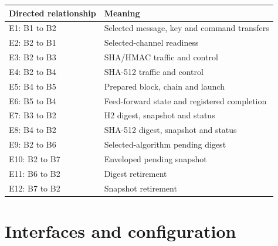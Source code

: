 \documentclass[11pt,a4paper]{article}
\begin{document}
{\small\renewcommand{\arraystretch}{1.18}\begin{longtable}{@{}L{0.24\textwidth}|L{0.7\textwidth}@{}}\toprule

\textbf{Directed relationship} & \textbf{Meaning}\\\midrule\endhead

E1: B1 to B2 & Selected message,\allowbreak{} key and command transfers\\[2pt]\hline

E2: B2 to B1 & Selected-channel readiness\\[2pt]\hline

E3: B2 to B3 & SHA/\allowbreak{}HMAC traffic and control\\[2pt]\hline

E4: B2 to B4 & SHA-512 traffic and control\\[2pt]\hline

E5: B4 to B5 & Prepared block,\allowbreak{} chain and launch\\[2pt]\hline

E6: B5 to B4 & Feed-forward state and registered completion\\[2pt]\hline

E7: B3 to B2 & H2 digest,\allowbreak{} snapshot and status\\[2pt]\hline

E8: B4 to B2 & SHA-512 digest,\allowbreak{} snapshot and status\\[2pt]\hline

E9: B2 to B6 & Selected-algorithm pending digest\\[2pt]\hline

E10: B2 to B7 & Enveloped pending snapshot\\[2pt]\hline

E11: B6 to B2 & Digest retirement\\[2pt]\hline

E12: B7 to B2 & Snapshot retirement\\[2pt]\hline

\bottomrule\end{longtable}}

\section{Interfaces and configuration}
\end{document}
